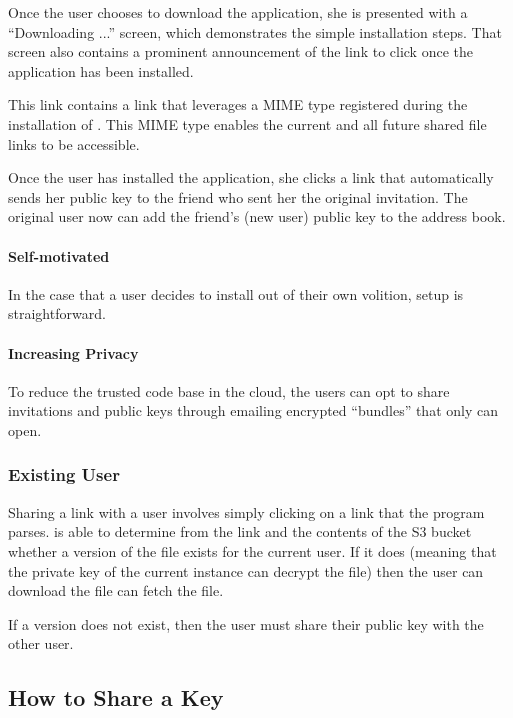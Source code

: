 Once the user chooses to download the \name application, she is
presented with a ``Downloading \name...'' screen, which demonstrates
the simple installation steps. That screen also contains a prominent
announcement of the link to click once the \name application has been
installed.

This link contains a link that leverages a MIME type registered during
the installation of \name. This MIME type enables the current and all
future shared file links to be accessible. 

Once the user has installed the application, she clicks a link that
automatically sends her public key to the friend who sent her the
original invitation. The original user now can add the friend's (new
\name user) public key to the \name address book.

\paragraph{Self-motivated} In the case that a user decides to install
\name out of their own volition, setup is straightforward.

\paragraph{Increasing Privacy} To reduce the trusted code base in the
cloud, the users can opt to share invitations and public keys through
emailing encrypted ``bundles'' that only \name can open.


\subsubsection*{Existing \name User}

Sharing a link with a user involves simply clicking on a link that the
\name program parses. \name is able to determine from the link and the
contents of the S3 bucket whether a version of the file exists for the
current user. If it does (meaning that the private key of the current
\name instance can decrypt the file) then the user can download the
file can fetch the file. 

If a version does not exist, then the user must share their public key
with the other user.

\subsection{How to Share a Key}

